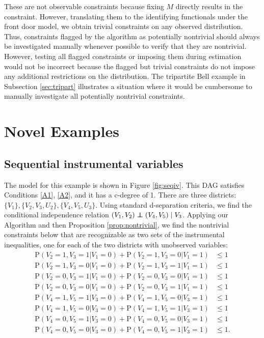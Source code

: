 \documentclass[12pt]{article}
\newcommand\indep{\protect\mathpalette{\protect\independenT}{\perp}}
\def\independenT#1#2{\mathrel{\rlap{$#1#2$}\mkern2mu{#1#2}}}
\def\Pr{{\mathrm{P}}}
\begin{document}
These are not observable constraints because fixing $M$ directly results in the constraint. However, translating them to the identifying functionals under the front door model, we obtain trivial constraints on any observed distribution. Thus, constraints flagged by the algorithm as potentially nontrivial should always be investigated manually whenever possible to verify that they are nontrivial. However, testing all flagged constraints or imposing them during estimation would not be incorrect because the flagged but trivial constraints do not impose any additional restrictions on the distribution. The tripartite Bell example in Subsection \ref{sec:tripart} illustrates a situation where it would be cumbersome to manually investigate all potentially nontrivial constraints. 

\section{Novel Examples}
\subsection{Sequential instrumental variables}

The model for this example is shown in Figure \ref{fig:seqiv}. This DAG satisfies Conditions \ref{A1}, \ref{A2}, and it has a c-degree of 1. There are three districts: $\{V_1\}, \{V_2, V_3, U_2\}, \{V_4, V_5, U_3\}$. Using standard d-separation criteria, we find the conditional independence relation $(V_1, V_2) \indep (V_4, V_5) \mid V_3$. Applying our Algorithm and then Proposition \ref{prop:nontrivial}, we find the nontrivial constraints below that are recognizable as two sets of the instrumental inequalities, one for each of the two districts with unobserved variables: 
\begin{eqnarray*}
\Pr(V_2 = 1, V_3 = 1 | V_1 = 0) + \Pr(V_2 = 1, V_3 = 0 | V_1 = 1) &\leq 1 \\
\Pr(V_2 = 1, V_3 = 0 | V_1 = 0) + \Pr(V_2 = 1, V_3 = 1 | V_1 = 1) &\leq 1 \\
\Pr(V_2 = 0, V_3 = 1 | V_1 = 0) + \Pr(V_2 = 0, V_3 = 0 | V_1 = 1) &\leq 1 \\
\Pr(V_2 = 0, V_3 = 0 | V_1 = 0) + \Pr(V_2 = 0, V_3 = 1 | V_1 = 1) &\leq 1 \\
\Pr(V_4 = 1, V_5 = 1 | V_3 = 0) + \Pr(V_4 = 1, V_5 = 0 | V_3 = 1) &\leq 1 \\
\Pr(V_4 = 1, V_5 = 0 | V_3 = 0) + \Pr(V_4 = 1, V_5 = 1 | V_3 = 1) &\leq 1 \\
\Pr(V_4 = 0, V_5 = 1 | V_3 = 0) + \Pr(V_4 = 0, V_5 = 0 | V_3 = 1) &\leq 1 \\
\Pr(V_4 = 0, V_5 = 0 | V_3 = 0) + \Pr(V_4 = 0, V_5 = 1 | V_3 = 1) &\leq 1.
\end{eqnarray*}
\end{document}
